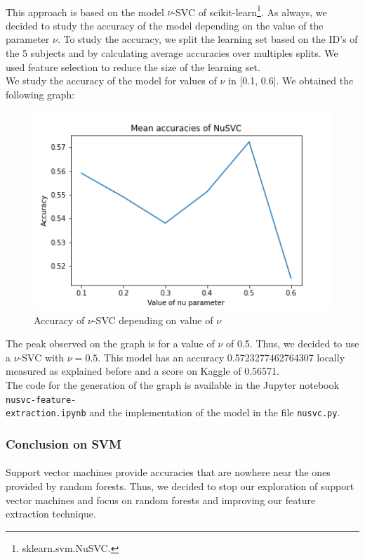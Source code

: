 \documentclass[a4paper, 11pt, oneside]{article}
\begin{document}
\paragraph{}This approach is based on the model $\nu$-SVC of scikit-learn\footnote{sklearn.svm.NuSVC.}. As always, we decided to study the accuracy of the model depending on the value of the parameter $\nu$. To study the accuracy, we split the learning set based on the ID's of the 5 subjects and by calculating average accuracies over multiples splits. We used feature selection to reduce the size of the learning set.\\
We study the accuracy of the model for values of $\nu$ in [0.1, 0.6]. We obtained the following graph:
\begin{figure}[H]
\centering
\includegraphics[scale=0.4]{nusvm/svm_nu_svc_accuracies_1.png}
\caption{Accuracy of $\nu$-SVC depending on value of $\nu$}
\end{figure}
The peak observed on the graph is for a value of $\nu$ of 0.5. Thus, we decided to use a $\nu$-SVC with $\nu = 0.5$. This model has an accuracy 0.5723277462764307 locally measured as explained before and a score on Kaggle of 0.56571.\\
The code for the generation of the graph is available in the Jupyter notebook \texttt{nusvc-feature-\\extraction.ipynb} and the implementation of the model in the file \texttt{nusvc.py}.

\subsubsection{Conclusion on SVM}
\paragraph{}Support vector machines provide accuracies that are nowhere near the ones provided by random forests. Thus, we decided to stop our exploration of support vector machines and focus on random forests and improving our feature extraction technique.
\end{document}
